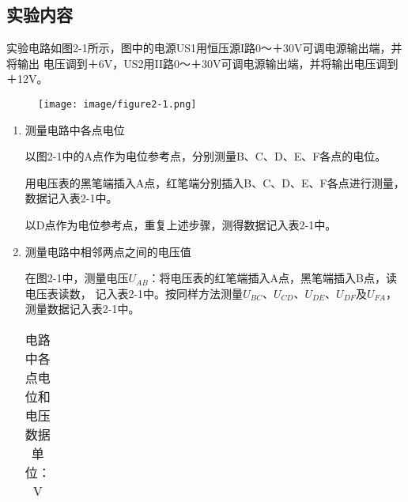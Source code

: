 \documentclass[UTF8]{article}
\begin{document}
        \subsection{实验内容}
            \noindent\hspace{2em}实验电路如图2-1所示，图中的电源US1用恒压源I路0～＋30V可调电源输出端，并将输出
            电压调到＋6V，US2用II路0～＋30V可调电源输出端，并将输出电压调到＋12V。
            \begin{figure}[H]
                \centering
                \texttt{[image: image/figure2-1.png]}
                \caption{}
            \end{figure}
            \begin{enumerate}
                \item 测量电路中各点电位\par
                \noindent\hspace{2em}以图2-1中的A点作为电位参考点，分别测量B、C、D、E、F各点的电位。
                \par
                \noindent\hspace{2em}用电压表的黑笔端插入A点，红笔端分别插入B、C、D、E、F各点进行测量，数据记入表2-1中。
                \par
                \noindent\hspace{2em}以D点作为电位参考点，重复上述步骤，测得数据记入表2-1中。
                \item 测量电路中相邻两点之间的电压值
                \par
                \noindent\hspace{2em}在图2-1中，测量电压$U_{AB}$：将电压表的红笔端插入A点，黑笔端插入B点，读电压表读数，
                记入表2-1中。按同样方法测量$U_{BC}$、$U_{CD}$、$U_{DE}$、$U_{DF}$及$U_{FA}$，测量数据记入表2-1中。
                \begin{table}[H]
                    \centering
                    \caption{电路中各点电位和电压数据\quad 单位：V }
                    \small
                    \begin{tabularx}{\textwidth}{
                        |>{\centering\arraybackslash}X
                        |>{\centering\arraybackslash}X
                        |>{\centering\arraybackslash}X
                        |>{\centering\arraybackslash}X
                        |>{\centering\arraybackslash}X
                        |>{\centering\arraybackslash}X
                        |>{\centering\arraybackslash}X
                        |>{\centering\arraybackslash}X
}
\end{tabularx}
\end{table}
\end{enumerate}
\end{document}
